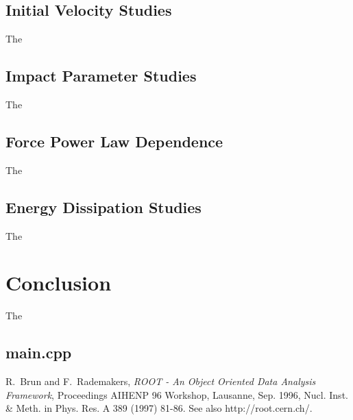 \documentclass[aps,prl,floatfix,preprint,nofootinbib]{revtex4}
\begin{document}
\subsection{Initial Velocity Studies}
The

\subsection{Impact Parameter Studies}
The

\subsection{Force Power Law Dependence}
The

\subsection{Energy Dissipation Studies}
The

\section{Conclusion}
The

\clearpage
\begin{appendices}
\singlespacing
\section{main.cpp} \label{sec:main}

\end{appendices}



\begin{thebibliography}{9}
  R.~Brun and F.~Rademakers, \emph{ROOT - An Object Oriented Data Analysis Framework}, Proceedings AIHENP 96 Workshop, Lausanne, Sep. 1996, Nucl. Inst. \& Meth. in Phys. Res. A 389 (1997) 81-86. See also http://root.cern.ch/.

\end{thebibliography}
\end{document}
